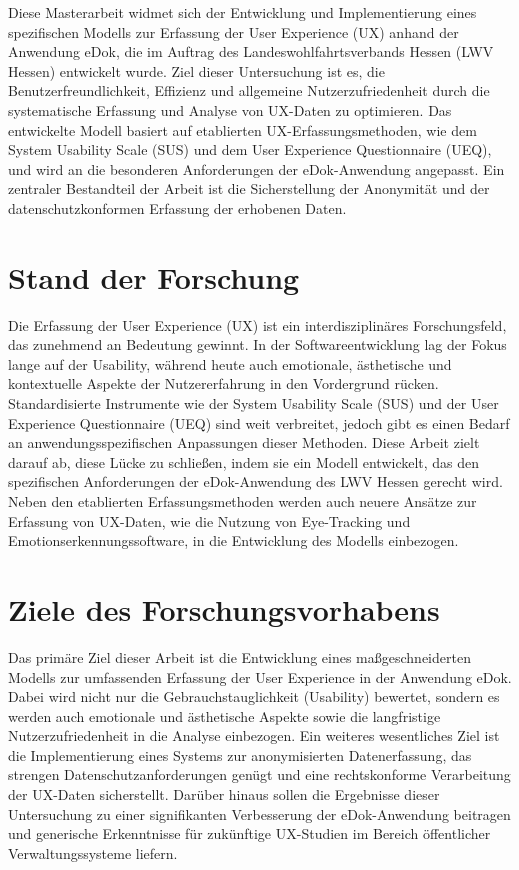\documentclass[12pt,a4paper]{article}
\begin{document}
\noindent
Diese Masterarbeit widmet sich der Entwicklung und Implementierung eines spezifischen Modells zur Erfassung der User Experience (UX) anhand der Anwendung eDok, die im Auftrag des Landeswohlfahrtsverbands Hessen (LWV Hessen) entwickelt wurde. Ziel dieser Untersuchung ist es, die Benutzerfreundlichkeit, Effizienz und allgemeine Nutzerzufriedenheit durch die systematische Erfassung und Analyse von UX-Daten zu optimieren. Das entwickelte Modell basiert auf etablierten UX-Erfassungsmethoden, wie dem System Usability Scale (SUS) und dem User Experience Questionnaire (UEQ), und wird an die besonderen Anforderungen der eDok-Anwendung angepasst. Ein zentraler Bestandteil der Arbeit ist die Sicherstellung der Anonymität und der datenschutzkonformen Erfassung der erhobenen Daten.

\newpage
\section*{Stand der Forschung}

\noindent
Die Erfassung der User Experience (UX) ist ein interdisziplinäres Forschungsfeld, das zunehmend an Bedeutung gewinnt. In der Softwareentwicklung lag der Fokus lange auf der Usability, während heute auch emotionale, ästhetische und kontextuelle Aspekte der Nutzererfahrung in den Vordergrund rücken. Standardisierte Instrumente wie der System Usability Scale (SUS) und der User Experience Questionnaire (UEQ) sind weit verbreitet, jedoch gibt es einen Bedarf an anwendungsspezifischen Anpassungen dieser Methoden. Diese Arbeit zielt darauf ab, diese Lücke zu schließen, indem sie ein Modell entwickelt, das den spezifischen Anforderungen der eDok-Anwendung des LWV Hessen gerecht wird. Neben den etablierten Erfassungsmethoden werden auch neuere Ansätze zur Erfassung von UX-Daten, wie die Nutzung von Eye-Tracking und Emotionserkennungssoftware, in die Entwicklung des Modells einbezogen.

\newpage
\section*{Ziele des Forschungsvorhabens}

\noindent
Das primäre Ziel dieser Arbeit ist die Entwicklung eines maßgeschneiderten Modells zur umfassenden Erfassung der User Experience in der Anwendung eDok. Dabei wird nicht nur die Gebrauchstauglichkeit (Usability) bewertet, sondern es werden auch emotionale und ästhetische Aspekte sowie die langfristige Nutzerzufriedenheit in die Analyse einbezogen. Ein weiteres wesentliches Ziel ist die Implementierung eines Systems zur anonymisierten Datenerfassung, das strengen Datenschutzanforderungen genügt und eine rechtskonforme Verarbeitung der UX-Daten sicherstellt. Darüber hinaus sollen die Ergebnisse dieser Untersuchung zu einer signifikanten Verbesserung der eDok-Anwendung beitragen und generische Erkenntnisse für zukünftige UX-Studien im Bereich öffentlicher Verwaltungssysteme liefern.
\end{document}
